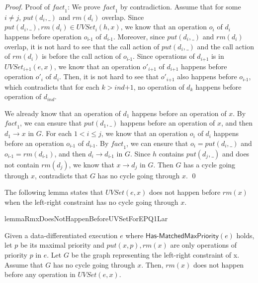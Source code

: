 \begin {proof}
Proof of $\textit{fact}_1$: We prove $\textit{fact}_1$ by contradiction. Assume that for some $i \neq j$, $\textit{put}(d_i,\_)$ and $\textit{rm}(d_i)$ overlap. Since $\textit{put}(d_i,\_), \textit{rm}(d_i) \in \textit{UVSet}_i(h,x)$, we know that an operation $o_i$ of $d_i$ happens before operation $o_{\textit{i-1}}$ of $d_{\textit{i-1}}$. Moreover, since $\textit{put}(d_i,\_)$ and $\textit{rm}(d_i)$ overlap, it is not hard to see that the call action of $\textit{put}(d_i,\_)$ and the call action of $\textit{rm}(d_i)$ is before the call action of $o_{\textit{i-1}}$. Since operations of $d_{\textit{i+1}}$ is in $\textit{UVSet}_{\textit{i+1}}(e,x)$, we know that an operation $o'_{\textit{i+1}}$ of $d_{\textit{i+1}}$ happens before operation $o'_i$ of $d_i$. Then, it is not hard to see that $o'_{\textit{i+1}}$ also happens before $o_{\textit{i-1}}$, which contradicts that for each $k > \textit{ind+1}$, no operation of $d_k$ happens before operation of $d_{\textit{ind}}$.

We already know that an operation of $d_1$ happens before an operation of $x$. By $\textit{fact}_1$, we can ensure that $\textit{put}(d_1,\_)$ happens before an operation of $x$, and then $d_1 \rightarrow x$ in $G$. For each $1 < i \leq j$, we know that an operation $o_i$ of $d_i$ happens before an operation $o_{\textit{i-1}}$ of $d_{\textit{i-1}}$. By $\textit{fact}_1$, we can ensure that $o_i=\textit{put}(d_i,\_)$ and $o_{\textit{i-1}}=\textit{rm}(d_{\textit{i-1}})$, and then $d_i \rightarrow d_{\textit{i-1}}$ in $G$. Since $h$ contains $\textit{put}(d_j,\_)$ and does not contain $\textit{rm}(d_j)$, we know that $x \rightarrow d_j$ in $G$. Then $G$ has a cycle going through $x$, contradicts that $G$ has no cycle going through $x$. \qed
\end {proof}


The following lemma states that $\textit{UVSet}(e,x)$ does not happen before $\textit{rm}(x)$ when the left-right constraint has no cycle going through $x$.

\begin{restatable}{lemma}{RmxDoesNotHappenBeforeUVSetForEPQ1Lar}
\label{lemma:Rmx does not happen before UVSet for EPQ1Lar}

Given a data-differentiated execution $e$ where $\mathsf{Has\text{-}MatchedMaxPriority}(e)$ holds, let $p$ be its maximal priority and $\textit{put}(x,p),\textit{rm}(x)$ are only operations of priority $p$ in $e$. Let $G$ be the graph representing the left-right constraint of x. Assume that $G$ has no cycle going through $x$. Then, $\textit{rm}(x)$ does not happen before any operation in $\textit{UVSet}(e,x)$.
\end{restatable}

